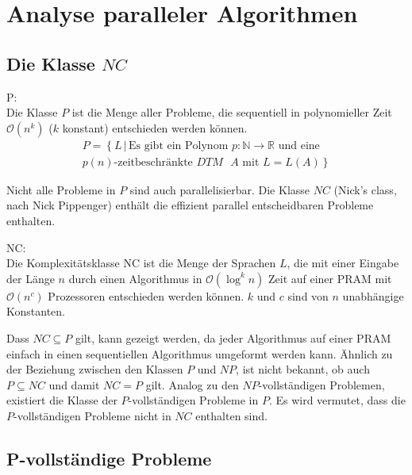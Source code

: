\section{Analyse paralleler Algorithmen}

\subsection{Die Klasse $NC$}
\begin{define}
    P: \\
    Die Klasse $P$ ist die Menge aller Probleme, die sequentiell in polynomieller Zeit $\mathcal{O}(n^k)$ ($k$ konstant) entschieden werden können.
    \begin{equation}
        \begin{split}
            P = \left\{ L \, | \, \text{Es gibt ein Polynom } p\colon \mathbb{N} \to \mathbb{R} \right.
            \text{ und eine} \\ \left. \text{$p(n)$-zeitbeschränkte $DTM$ $A$ mit } L = L(A) \right\}
        \end{split}
    \end{equation}\cite[S.205]{fgi1}
\end{define}
Nicht alle Probleme in $P$ sind auch parallelisierbar.
Die Klasse $NC$ (Nick's class, nach Nick Pippenger) enthält die effizient parallel
entscheidbaren Probleme enthalten.
\begin{define}
    NC: \\
    Die Komplexitätsklasse NC ist die Menge der Sprachen $L$,
    die mit einer Eingabe der Länge $n$ durch einen Algorithmus
    in $\mathcal{O}\left( \log^k n \right)$ Zeit auf einer PRAM
    mit $\mathcal{O}\left( n^c \right)$ Prozessoren entschieden werden können.
    $k$ und $c$ sind von $n$ unabhängige Konstanten.
\end{define}
Dass $NC \subseteq P$ gilt, kann gezeigt werden, da jeder Algorithmus auf einer PRAM
einfach in einen sequentiellen Algorithmus umgeformt werden kann.
Ähnlich zu der Beziehung zwischen den Klassen $P$ und $NP$, ist nicht bekannt,
ob auch $P \subseteq NC$ und damit $NC = P$ gilt.
Analog zu den $NP$-vollständigen Problemen, existiert die Klasse der $P$-vollständigen Probleme in $P$.
Es wird vermutet, dass die $P$-vollständigen Probleme nicht in $NC$ enthalten sind.
\cite[S.535]{jaja}

\subsection{P-vollständige Probleme}
